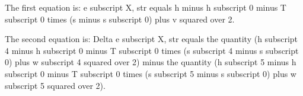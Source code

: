 The first equation is:
e subscript X, str equals h minus h subscript 0 minus T subscript 0 times (s minus s subscript 0) plus v squared over 2.

The second equation is:
Delta e subscript X, str equals the quantity (h subscript 4 minus h subscript 0 minus T subscript 0 times (s subscript 4 minus s subscript 0) plus w subscript 4 squared over 2) minus the quantity (h subscript 5 minus h subscript 0 minus T subscript 0 times (s subscript 5 minus s subscript 0) plus w subscript 5 squared over 2).